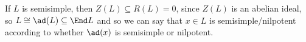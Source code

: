 If $L$ is semisimple, then $Z(L) \subseteq R(L) = 0$, since $Z(L)$ is an abelian
ideal, so $L \cong \ad(L) \subseteq \End L$ and so we can say that
$x \in L$ is semisimple/nilpotent according to whether $\ad(x)$ is semisimple
or nilpotent.
